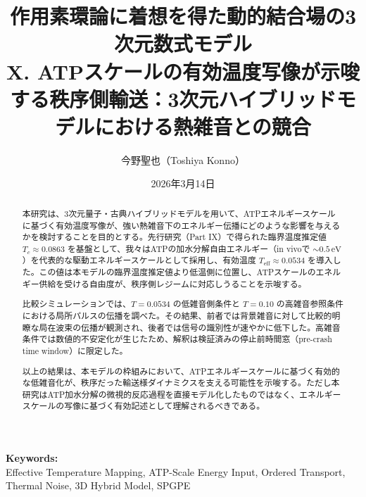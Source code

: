\documentclass[a4paper,11pt,ja=standard,lualatex]{bxjsarticle}
\begin{document}
\title{作用素環論に着想を得た動的結合場の3次元数式モデル\\
\large X. ATPスケールの有効温度写像が示唆する秩序側輸送：3次元ハイブリッドモデルにおける熱雑音との競合}
\author[1]{今野聖也（Toshiya Konno）}
\date{2026年3月14日}
\maketitle

\noindent\textbf{Keywords:}\\
Effective Temperature Mapping, ATP-Scale Energy Input, Ordered Transport, Thermal Noise, 3D Hybrid Model, SPGPE

\begin{abstract}
\noindent
本研究は、3次元量子・古典ハイブリッドモデルを用いて、ATPエネルギースケールに基づく有効温度写像が、強い熱雑音下のエネルギー伝播にどのような影響を与えるかを検討することを目的とする。先行研究（Part IX）で得られた臨界温度推定値 $T_c \approx 0.0863$ を基盤として、我々はATPの加水分解自由エネルギー（in vivoで $\sim 0.5\,\mathrm{eV}$）を代表的な駆動エネルギースケールとして採用し、有効温度 $T_{\mathrm{eff}} \approx 0.0534$ を導入した。この値は本モデルの臨界温度推定値より低温側に位置し、ATPスケールのエネルギー供給を受ける自由度が、秩序側レジームに対応しうることを示唆する。

比較シミュレーションでは、$T=0.0534$ の低雑音側条件と $T=0.10$ の高雑音参照条件における局所パルスの伝播を調べた。その結果、前者では背景雑音に対して比較的明瞭な局在波束の伝播が観測され、後者では信号の識別性が速やかに低下した。高雑音条件では数値的不安定化が生じたため、解釈は検証済みの停止前時間窓（pre-crash time window）に限定した。

以上の結果は、本モデルの枠組みにおいて、ATPエネルギースケールに基づく有効的な低雑音化が、秩序だった輸送様ダイナミクスを支える可能性を示唆する。ただし本研究はATP加水分解の微視的反応過程を直接モデル化したものではなく、エネルギースケールの写像に基づく有効記述として理解されるべきである。
\end{abstract}
\end{document}
